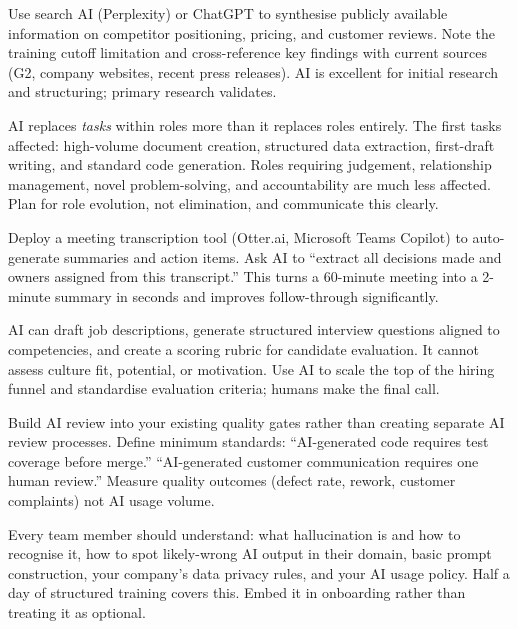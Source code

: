 {Use search AI (Perplexity) or ChatGPT to synthesise publicly available information
on competitor positioning, pricing, and customer reviews.
Note the training cutoff limitation and cross-reference key findings with current
sources (G2, company websites, recent press releases).
AI is excellent for initial research and structuring; primary research validates.}

{AI replaces \emph{tasks} within roles more than it replaces roles entirely.
The first tasks affected: high-volume document creation, structured data extraction,
first-draft writing, and standard code generation.
Roles requiring judgement, relationship management, novel problem-solving, and
accountability are much less affected.
Plan for role evolution, not elimination, and communicate this clearly.}

{Deploy a meeting transcription tool (Otter.ai, Microsoft Teams Copilot) to auto-generate
summaries and action items.
Ask AI to ``extract all decisions made and owners assigned from this transcript.''
This turns a 60-minute meeting into a 2-minute summary in seconds and improves
follow-through significantly.}

{AI can draft job descriptions, generate structured interview questions aligned to
competencies, and create a scoring rubric for candidate evaluation.
It cannot assess culture fit, potential, or motivation.
Use AI to scale the top of the hiring funnel and standardise evaluation criteria;
humans make the final call.}

{Build AI review into your existing quality gates rather than creating separate AI
review processes.
Define minimum standards: ``AI-generated code requires test coverage before merge.''
``AI-generated customer communication requires one human review.''
Measure quality outcomes (defect rate, rework, customer complaints) not AI usage
volume.}

{Every team member should understand: what hallucination is and how to recognise it,
how to spot likely-wrong AI output in their domain, basic prompt construction, your
company's data privacy rules, and your AI usage policy.
Half a day of structured training covers this.
Embed it in onboarding rather than treating it as optional.}

